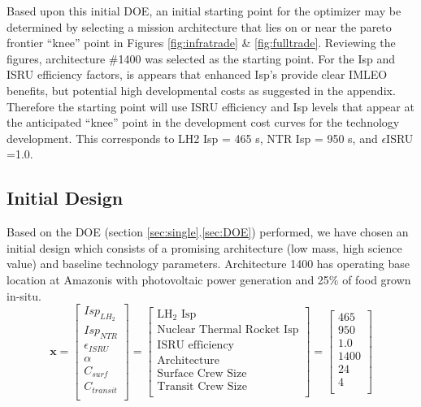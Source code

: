 \documentclass[]{aiaa-pretty}
\begin{document}
Based upon this initial DOE, an initial starting point for the optimizer may be determined by selecting a mission architecture that lies on or near the pareto frontier “knee” point in Figures \ref{fig:infratrade} \& \ref{fig:fulltrade}. Reviewing the figures, architecture \#1400 was selected as the starting point. For the Isp and ISRU efficiency factors, is appears that enhanced Isp’s provide clear IMLEO benefits, but potential high developmental costs as suggested in the appendix. Therefore the starting point will use ISRU efficiency and Isp levels that appear at the anticipated “knee” point in the development cost curves for the technology development. This corresponds to LH2 Isp = 465 s, NTR Isp = 950 s, and $\epsilon$ISRU =1.0.

\subsection{Initial Design}
Based on the DOE (section \ref{sec:single}.\ref{sec:DOE}) performed, we have chosen an initial design which consists of a promising architecture (low mass, high science value) and baseline technology parameters. Architecture 1400 has operating base location at Amazonis with photovoltaic power generation and 25\% of food grown in-situ.
\begin{equation*}
\mathbf{x}=
\begin{bmatrix}
Isp_{LH_2}\\
Isp_{NTR}\\
\epsilon_{ISRU}\\
\alpha\\
C_{surf}\\
C_{transit}\\
\end{bmatrix}
=
\begin{bmatrix}
\mbox{LH}_2\mbox{ Isp}\\
\mbox{Nuclear Thermal Rocket Isp}\\
\mbox{ISRU efficiency}\\
\mbox{Architecture}\\
\mbox{Surface Crew Size}\\
\mbox{Transit Crew Size}\\
\end{bmatrix}
=
\begin{bmatrix}
465\\
950\\
1.0\\
1400\\
24\\
4\\
\end{bmatrix}
\end{equation*}
\end{document}
